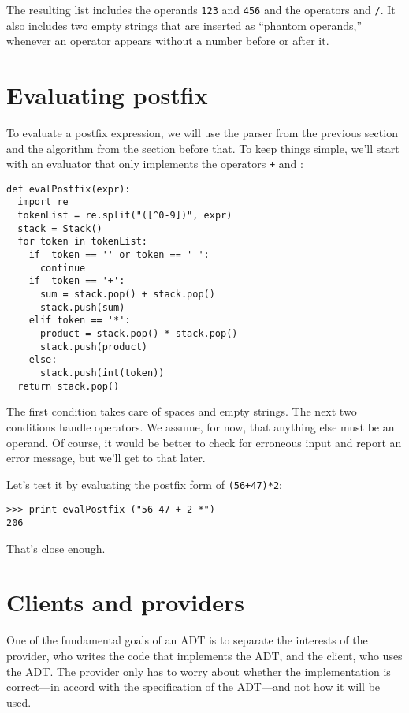 The resulting list includes the operands {\tt 123} and {\tt 456} and
the operators {\tt *} and {\tt /}.  It also includes two empty
strings that are inserted as ``phantom operands,'' whenever an
operator appears without a number before or after it.


\section {Evaluating postfix}

To evaluate a postfix expression, we will use the parser from
the previous section and the algorithm from the section before that.
To keep things simple, we'll start with an evaluator that
only implements the operators {\tt +} and {\tt *}:

\pagebreak

\beforeverb
\begin{verbatim}
def evalPostfix(expr):
  import re
  tokenList = re.split("([^0-9])", expr)
  stack = Stack()
  for token in tokenList:
    if  token == '' or token == ' ':
      continue
    if  token == '+':
      sum = stack.pop() + stack.pop()
      stack.push(sum)
    elif token == '*':
      product = stack.pop() * stack.pop()
      stack.push(product)
    else:
      stack.push(int(token))
  return stack.pop()
\end{verbatim}
\afterverb
%
The first condition takes care of spaces and empty strings.  The next
two conditions handle operators. We assume, for now, that anything
else must be an operand.  Of course, it would be better to check for
erroneous input and report an error message, but we'll get to that
later.

Let's test it by evaluating the postfix form of {\tt (56+47)*2}:

\beforeverb
\begin{verbatim}
>>> print evalPostfix ("56 47 + 2 *")
206
\end{verbatim}
\afterverb
%
That's close enough.


\section {Clients and providers}

One of the fundamental goals of an ADT is to separate the
interests of the provider, who writes the code that implements
the ADT, and the client, who uses the ADT.
The provider only has to worry
about whether the implementation is correct---in accord
with the specification of the ADT---and not how it will be used.

